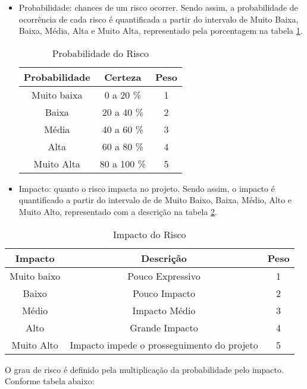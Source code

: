 \begin{itemize}
\item Probabilidade: chances de um risco ocorrer. Sendo assim, a probabilidade de ocorrência de cada risco é quantificada a partir do intervalo
de Muito Baixa, Baixa, Média, Alta e Muito Alta, representado pela porcentagem na tabela \ref{tab:probabilidade}.

\begin{table}[H]
\centering
\caption{Probabilidade do Risco}
\label{tab:probabilidade}
\begin{tabular}{|c|c|c|}
\hline
\rowcolor[HTML]{A8DADC}
\textbf{Probabilidade} & \textbf{Certeza} & \textbf{Peso} \\ \hline
Muito baixa	 & 0 a 20 \% & 1
 \\ \hline
Baixa & 20 a 40 \% & 2 \\ \hline
Média & 40 a 60 \% & 3 \\ \hline
Alta & 60 a 80 \% & 4 \\ \hline
Muito Alta & 80 a 100 \% & 5 \\ \hline
\end{tabular}
\end{table}

\item Impacto: quanto o risco impacta no projeto. Sendo assim, o impacto é quantificado a partir do intervalo de de Muito Baixo, Baixa, Médio, Alto e Muito Alto, representado com a descrição na tabela \ref{tab:impacto}.

\end{itemize}

\begin{table}[H]
\centering
\caption{ Impacto do Risco}
\label{tab:impacto}
\begin{tabular}{|c|c|c|}
\hline
\rowcolor[HTML]{A8DADC}
\textbf{Impacto} & \textbf{Descrição} & \textbf{Peso} \\ \hline
Muito baixo	 & Pouco Expressivo	 & 1
 \\ \hline
Baixo & Pouco Impacto & 2 \\ \hline
Médio & Impacto Médio & 3 \\ \hline
Alto & Grande Impacto & 4 \\ \hline
Muito Alto & Impacto impede o prosseguimento do projeto & 5 \\ \hline
\end{tabular}
\end{table}

O grau de risco é definido pela multiplicação da probabilidade pelo impacto. Conforme tabela abaixo:


